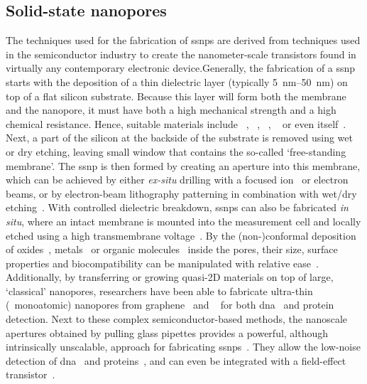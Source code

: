 \subsection{Solid-state nanopores}
%

The techniques used for the fabrication of \glspl{ssnp} are derived from techniques used in the semiconductor
industry to create the nanometer-scale transistors found in virtually any contemporary electronic
device.Generally, the fabrication of a \gls{ssnp} starts with the deposition of a thin dielectric layer
(typically \SIrange{5}{50}{\nm}) on top of a flat silicon substrate. Because this layer will form both the
membrane and the nanopore, it must have both a high mechanical strength and a high chemical resistance. Hence,
suitable materials include ~\cite{Li-2001,Storm-2003}, ~\cite{Storm-2005},
~\cite{Venkatesan-2009}, ~\cite{Larkin-2013} or even 
itself~\cite{Malachowski-2013}. Next, a part of the silicon at the backside of the substrate is removed using
wet or dry etching, leaving small window that contains the so-called `free-standing membrane'. The \gls{ssnp}
is then formed by creating an aperture into this membrane, which can be achieved by either \textit{ex-situ}
drilling with a focused ion~\cite{Li-2001} or electron~\cite{Storm-2003} beams, or by electron-beam
lithography patterning in combination with wet/dry etching~\cite{Nam-2009}. With controlled dielectric
breakdown, \glspl{ssnp} can also be fabricated \textit{in situ}, where an intact membrane is mounted into the
measurement cell and locally etched using a high transmembrane voltage~\cite{Kwok-2014}. By the
(non-)conformal deposition of oxides~\cite{Chen-2004}, metals~\cite{Li-2013d,Auger-2014,Spitzberg-2019} or
organic molecules~\cite{Wanunu-2007,Yusko-2011,Wei-2012,Rotem-2012} inside the pores, their size, surface
properties and biocompatibility can be manipulated with relative ease~\cite{Eggenberger-2019}. Additionally,
by transferring or growing quasi-2D materials on top of large, `classical' nanopores, researchers have been
able to fabricate ultra-thin (\ie~monoatomic) nanopores from graphene~\cite{Fischbein-2008} and
~\cite{Feng-2015b} for both \gls{dna}~\cite{Feng-2015,Merchant-2010,Song-2011} and
protein~\cite{Shan-2013} detection. Next to these complex semiconductor-based methods, the nanoscale apertures
obtained by pulling glass pipettes provides a powerful, although intrinsically unscalable, approach for
fabricating \glspl{ssnp}~\cite{Wang-2006}. They allow the low-noise detection of
\gls{dna}~\cite{Steinbock-2013} and proteins~\cite{Li-2013B}, and can even be integrated with a field-effect
transistor~\cite{Ren-2020}.



